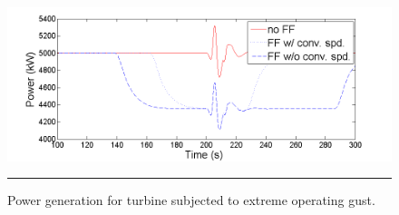 \begin{figure}[htbp]
	\centering
		\includegraphics[trim = {1cm 0 2cm 0}, clip, width = \linewidth]{Figures/ch4Figures/fig4-26.png}
		\rule{35em}{0.5pt}
	\caption{Power generation for turbine subjected to extreme operating gust.}
	\label{fig4-26}
\end{figure}


